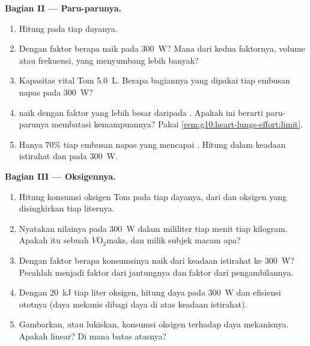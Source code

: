 \begin{problem}
\medskip
\noindent\textbf{Bagian II --- Paru-parunya.}
\begin{enumerate}[resume]
  \item Hitung  pada tiap dayanya.
  \item Dengan faktor berapa  naik pada \qty{300}{W}? Mana
        dari kedua faktornya, volume atau frekuensi, yang menyumbang
        lebih banyak?
  \item Kapasitas vital Tom \qty{5.0}{L}. Berapa bagiannya yang dipakai
        tiap embusan napas pada \qty{300}{W}?
  \item {} naik dengan faktor yang lebih besar daripada . Apakah ini berarti paru-parunya membatasi
        kemampuannya? Pakai \cref{rem:g10:heart-lungs-effort:limit}.
  \item Hanya 70\% tiap embusan napas yang mencapai . Hitung
          dalam keadaan istirahat dan pada \qty{300}{W}.
\end{enumerate}

\medskip
\noindent\textbf{Bagian III --- Oksigennya.}
\begin{enumerate}[resume]
  \item Hitung konsumsi oksigen Tom pada tiap dayanya, dari  dan oksigen yang disingkirkan tiap liternya.
  \item Nyatakan nilainya pada \qty{300}{W} dalam mililiter tiap menit
        tiap kilogram. Apakah itu sebuah $\dot V\!\mathrm{O_2}$maks,
        dan milik subjek macam apa?
  \item Dengan faktor berapa konsumsinya naik dari keadaan istirahat ke
        \qty{300}{W}? Pecahlah menjadi faktor dari jantungnya dan
        faktor dari pengambilannya.
  \item Dengan \qty{20}{kJ} tiap liter oksigen, hitung daya
         pada \qty{300}{W} dan efisiensi ototnya (daya
        mekanis dibagi daya  di atas keadaan istirahat).
  \item Gambarkan, atau lukiskan, konsumsi oksigen terhadap daya
        mekanisnya. Apakah linear? Di mana batas atasnya?
\end{enumerate}


\end{problem}
